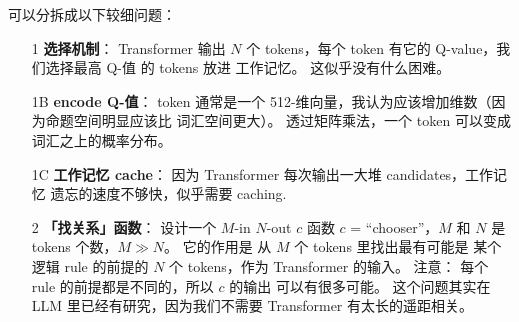 \newcommand{\circled}[1]{{\textcircled{\sffamily \scriptsize{#1}}}}



\begin{preview}

\cc{
\title{\vspace{-1.5cm} \bfseries\color{blue}{\LARGE AGI Prototype Road Map}}
}{
\title{\vspace{-1.5cm} \bfseries\color{blue}{\LARGE AGI Prototype Road Map}}
}

\date{\vspace{-2cm}} %

\maketitle

\setcounter{section}{-1}


\begin{minipage}{\textwidth}
\setlength{\parskip}{0.4\baselineskip}

可以分拆成以下较细问题：
\begin{itemize}
	\item [\circled{1}] \textbf{选择机制}： Transformer 输出 $N$ 个 tokens，每个 token 有它的 Q-value，我们选择最高 Q-值 的 tokens 放进 工作记忆。 这似乎没有什么困难。

	\item [\circled{1}{\small B}] \textbf{encode Q-值}： token 通常是一个 512-维向量，我认为应该增加维数（因为命题空间明显应该比 词汇空间更大）。 透过矩阵乘法，一个 token 可以变成词汇之上的概率分布。 

	\item [\circled{1}{\small C}] \textbf{工作记忆 cache}： 因为 Transformer 每次输出一大堆 candidates，工作记忆 遗忘的速度不够快，似乎需要 caching.

	\item [\circled{2}] \textbf{「找关系」函数}： 设计一个 $M$-in $N$-out $c$ 函数 $c$ = ``chooser''，$M$ 和 $N$ 是 tokens 个数，$M \gg N$。 它的作用是 从 $M$ 个 tokens 里找出最有可能是 某个逻辑 rule 的前提的 $N$ 个 tokens，作为 Transformer 的输入。 注意： 每个 rule 的前提都是不同的，所以 $c$ 的输出 可以有很多可能。 这个问题其实在 LLM 里已经有研究，因为我们不需要 Transformer 有太长的遥距相关。 
	

\end{itemize}
\end{minipage}
\end{preview}
